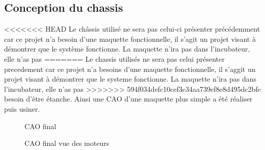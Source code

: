 \documentclass[a4paper, 11pt]{article}
\begin{document}
\subsection{Conception du chassis}
<<<<<<< HEAD
Le châssis utilisé ne sera pas celui-ci présenter précédemment car ce projet n'a besoin
d'une maquette fonctionnelle, il s'agit un projet visant à démontrer que 
le système fonctionne. La maquette n'ira pas dans l'incubateur, elle n'as pas 
=======
Le chassis utilisés ne sera pas celui présenter precedement car ce projet n'a besoins
d'une maquette fonctionnelle, il s'aggit un projet visant à démontrer que
le systeme fonctionne. La maquette n'ira pas dans l'incubateur, elle n'as pas
>>>>>>> 594f034defc10cef3c34aa739ef8e8d495dc2bfc
besoin d'être étanche.
Ainsi une CAO d'une maquette plus simple a été réaliser puis usiner.
\begin{multicols}{2}
    \begin{figure}[H]
        \centering
        \caption{CAO final}
        \label{fig:CAO_final}
    \end{figure}
    \begin{figure}[H]
        \centering
        \caption{CAO final vue des moteurs}
        \label{fig:CAO_final_dos}
    \end{figure}
\end{multicols}
\end{document}
